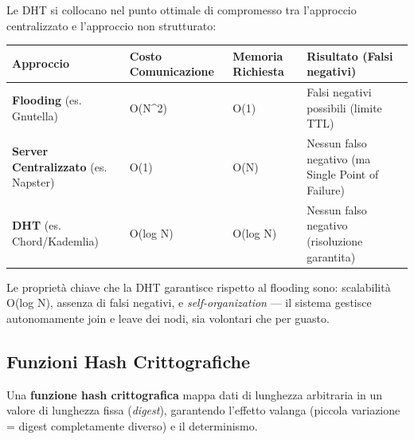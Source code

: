 \documentclass[
  italian,
  openany]{book}
\newcounter{none} %
\begin{document}
Le DHT si collocano nel punto ottimale di compromesso tra l'approccio
centralizzato e l'approccio non strutturato:

{\def\LTcaptype{none} %
\begin{longtable}[]{@{}
  >{\raggedright\arraybackslash}p{}
  >{\raggedright\arraybackslash}p{}
  >{\raggedright\arraybackslash}p{}
  >{\raggedright\arraybackslash}p{}@{}}
\toprule\noalign{}
\begin{minipage}[b]{\linewidth}\raggedright
Approccio
\end{minipage} & \begin{minipage}[b]{\linewidth}\raggedright
Costo Comunicazione
\end{minipage} & \begin{minipage}[b]{\linewidth}\raggedright
Memoria Richiesta
\end{minipage} & \begin{minipage}[b]{\linewidth}\raggedright
Risultato (Falsi negativi)
\end{minipage} \\
\midrule\noalign{}
\endhead
\bottomrule\noalign{}
\endlastfoot
\textbf{Flooding} (es. Gnutella) & O(N\^{}2) & O(1) & Falsi negativi
possibili (limite TTL) \\
\textbf{Server Centralizzato} (es. Napster) & O(1) & O(N) & Nessun falso
negativo (ma Single Point of Failure) \\
\textbf{DHT} (es. Chord/Kademlia) & O(log N) & O(log N) & Nessun falso
negativo (risoluzione garantita) \\
\end{longtable}
}

Le proprietà chiave che la DHT garantisce rispetto al flooding sono:
scalabilità O(log N), assenza di falsi negativi, e
\emph{self-organization} --- il sistema gestisce autonomamente join e
leave dei nodi, sia volontari che per guasto.

\subsection{Funzioni Hash
Crittografiche}\label{funzioni-hash-crittografiche}

Una \textbf{funzione hash crittografica} mappa dati di lunghezza
arbitraria in un valore di lunghezza fissa (\emph{digest}), garantendo
l'effetto valanga (piccola variazione = digest completamente diverso) e
il determinismo.
\end{document}
